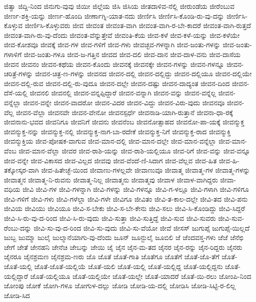 {ಜಿತ್ವಾ
ಜಿದ್ದಿ-ನಿಂದ
ಜಿನುಗು-ವುವು
ಜಿಯೀ
ಜಿಲ್ಲೆಯ
ಜಿಸಿ
ಜಿಸಿಯ
ಜೀತದಾಳಿವ-ನೆಲ್ಲಿ
ಜೀರುಂಡೆಯ
ಜೀರೆಂಬುವ
ಜೀರ್ಣ-ಶಕ್ತಿ-ಯನ್ನು
ಜೀರ್ಣ-ಹೊಂದಿ
ಜೀರ್ಣಾಗ್ನಿ-ಯಾತ-ನದು
ಜೀರ್ಣಿಸಿ
ಜೀರ್ಣಿಸಿ-ಕೊಂಡಿ-ರು-ವು-ದನ್ನು
ಜೀರ್ಣಿಸಿ-ಕೊಳ್ಳುವ
ಜೀರ್ಣಿಸಿ-ಕೊಳ್ಳುವರು
ಜೀವ
ಜೀವಂತ
ಜೀವಂತ-ವಾಗಿ
ಜೀವಂತ-ವಾಗಿ-ರ-ಬೇ-ಕಾದರೆ
ಜೀವಂತ-ವಾಗಿ-ರುತ್ತದೆ
ಜೀವಂತ-ವಾಗಿ-ರು-ವು-ದೆಂದು
ಜೀವಂತ-ವೆನ್ನುತ್ತೇವೆ
ಜೀವಂತಿ-ಕೆಯ
ಜೀವ-ಕಳೆ
ಜೀವ-ಕಳೆ-ಯನ್ನು
ಜೀವ-ಕಳೆಯೇ
ಜೀವ-ಕೋಶವೂ
ಜೀವಕ್ಕೆ
ಜೀವ-ಗಳ
ಜೀವ-ಗಳಿಗೆ
ಜೀವ-ಗಳು
ಜೀವಚ್ಛವ-ಗಳನ್ನಾಗಿ
ಜೀವ-ಜಂತು-ಗಳನ್ನು
ಜೀವ-ಜಂತು-ಗಳಾಳಿಗೆ
ಜೀವ-ಜಂತು-ಗಳೂ
ಜೀವ-ಜ-ಗತ್ತಿನ
ಜೀವದ
ಜೀವ-ದಲಿ
ಜೀವ-ದಾನ
ಜೀವ-ದಾಳ-ವನು
ಜೀವ-ದಾಸೆಯ
ಜೀವನ
ಜೀವನಂ
ಜೀವನ-ಕಥೆಯ
ಜೀವನ-ಕೊಂದು
ಜೀವನಕ್ಕೆ
ಜೀವನಕ್ಕೇ
ಜೀವನ-ಗಳನ್ನು
ಜೀವನ-ಗಳನ್ನೂ
ಜೀವನ-ಚರಿತ್ರೆ-ಗಳನ್ನು
ಜೀವನ-ಚಿತ್ರ-ಣ-ಗಳನ್ನು
ಜೀವನದ
ಜೀವನ-ದಲ್ಲಿ
ಜೀವನ-ದಲ್ಲಿದ್ದು
ಜೀವನ-ದಲ್ಲಿಯೂ
ಜೀವನ-ದಲ್ಲಿಯೇ
ಜೀವನ-ದಲ್ಲಿ-ರುವ
ಜೀವನ-ದಲ್ಲಿ-ರು-ವುದೂ
ಜೀವನ-ದಲ್ಲೇ
ಜೀವನ-ದಷ್ಟು
ಜೀವನ-ದಾದ್ಯಂತ
ಜೀವನ-ದಿಂದ
ಜೀವನ-ದೆಸೆ-ಯಲ್ಲಿ
ಜೀವನಲಿ
ಜೀವನಲ್ಲಿ
ಜೀವನ-ವನ್ನಪ್ಪಿದ್ದಾರೆ
ಜೀವನ-ವನ್ನಾಗಿ
ಜೀವನ-ವನ್ನು
ಜೀವನ-ವನ್ನೆಲ್ಲ
ಜೀವನ-ವನ್ನೆಲ್ಲಾ
ಜೀವನ-ವನ್ನೇ
ಜೀವನ-ವಾದರೋ
ಜೀವನ-ವಿದರ
ಜೀವನ-ವಿದ್ದು
ಜೀವನ-ವಿರು-ವುದು
ಜೀವನವೂ
ಜೀವನ-ವೆಲ್ಲ
ಜೀವನ-ವೆಲ್ಲಾ
ಜೀವನವೇ
ಜೀವನ-ವೇನೋ
ಜೀವನಸ್ಪರ್ಧೆ
ಜೀವನಾಡಿ-ಯಾಗಿ-ರುತ್ತಾನೆ
ಜೀವನಾ-ಧಾ-ರಕ್ಕೆ
ಜೀವನಾನು-ಭವದ
ಜೀವನಿಗೂ
ಜೀವನಿಗೆ
ಜೀವನು
ಜೀವನೆಂಬ
ಜೀವನೋತ್ಸಾಹದ
ಜೀವನೋ-ಪಾ-ಯಕ್ಕೆ
ಜೀವನ್ಮುಕ್ತ
ಜೀವನ್ಮುಕ್ತ-ನನ್ನು
ಜೀವನ್ಮುಕ್ತ-ನಲ್ಲಿ
ಜೀವನ್ಮುಕ್ತ-ನಾಗ-ಬಾ-ರದೇಕೆ
ಜೀವನ್ಮುಕ್ತ-ನಿಗೆ
ಜೀವನ್ಮುಕ್ತ-ರಾದ
ಜೀವನ್ಮುಕ್ತಿ
ಜೀವನ್ಮುಕ್ತಿಯ
ಜೀವ-ಪೋಷಕ-ವಾಗುವ
ಜೀವ-ಮಾನ-ದಲ್ಲಿ
ಜೀವ-ಮಾನ-ದಲ್ಲೇ
ಜೀವ-ಮಾನ-ವನ್ನೆಲ್ಲಾ
ಜೀವ-ಮಾನ-ವೆಂಬ
ಜೀವ-ಮಾನ-ವೆಲ್ಲಾ
ಜೀವರ
ಜೀವ-ರಾಶಿ-ಯನ್ನು
ಜೀವ-ರಾಶಿ-ಯಲ್ಲಿಯೂ
ಜೀವ-ರಿಗೆ
ಜೀವ-ವನ್ನು
ಜೀವ-ವನ್ನೂ
ಜೀವ-ವನ್ನೇ
ಜೀವ-ವಿಕಾಸದ
ಜೀವ-ವಿಲ್ಲದ
ಜೀವವು
ಜೀವ-ವೆಂದೆ-ಣಿ-ಸಿದಾಗ
ಜೀವ-ವೆಲ್ಲವ
ಜೀವ-ಹಿತ
ಜೀವ-ಹಿ-ತಕ್ಕೋಸ್ಕರ-ವಾಗಿ
ಜೀವ-ಹಿತೇಚ್ಛೆ-ಯಿಂದ
ಜೀವಾಣು-ಗಳಲ್ಲವೇ
ಜೀವಾಣುವೂ
ಜೀವಾತ್ಮ
ಜೀವಾತ್ಮ-ಗಳ
ಜೀವಾತ್ಮ-ಗಳನ್ನು
ಜೀವಾತ್ಮನ
ಜೀವಾತ್ಮ-ನಿ-ರುವನು
ಜೀವಾತ್ಮ-ನಿಲ್ಲ
ಜೀವಾತ್ಮನು
ಜೀವಾತ್ಮವು
ಜೀವಾಳ
ಜೀವಾಳ-ವಾಗಿದ್ದರು
ಜೀವಾ-ವಧಿಯ
ಜೀವಿ
ಜೀವಿ-ಗಳ
ಜೀವಿ-ಗಳನ್ನಾಗಿ
ಜೀವಿ-ಗಳನ್ನು
ಜೀವಿ-ಗಳನ್ನೂ
ಜೀವಿ-ಗ-ಳಲ್ಲೂ
ಜೀವಿ-ಗಳಾಗಿ
ಜೀವಿ-ಗಳಿಗೂ
ಜೀವಿ-ಗಳಿಗೆ
ಜೀವಿ-ಗಳು
ಜೀವಿ-ಗಳೆಲ್ಲಾ
ಜೀವಿ-ಗಳೇ
ಜೀವಿಗೂ
ಜೀವಿತಂ
ಜೀವಿ-ತ-ಕಾಲ-ದಲ್ಲೇ
ಜೀವಿ-ತದ
ಜೀವಿ-ಪನು
ಜೀವಿಯ
ಜೀವಿಯು
ಜೀವಿಯೂ
ಜೀವಿ-ಸ-ಬೇಕು
ಜೀವಿ-ಸ-ಬೇ-ಕೇನು
ಜೀವಿ-ಸಲು
ಜೀವಿ-ಸಿ-ಕೊಂಡಿದ್ದು
ಜೀವಿ-ಸಿದ್ದರೆ
ಜೀವಿ-ಸಿ-ರು-ವು-ದ-ರಿಂದ
ಜೀವಿ-ಸಿ-ರು-ವುದು
ಜೀವಿ-ಸುತ್ತಾ
ಜೀವಿ-ಸುತ್ತಿದ್ದೆ
ಜೀವಿ-ಸುವ
ಜೀವಿ-ಸುವರು
ಜೀವಿ-ಸುವ-ರೆಂಬು-ದನ್ನು
ಜೀವಿ-ಸು-ವು-ದ-ರಿಂದ
ಜೀವಿ-ಸು-ವುದು
ಜೀವಿ-ಸು-ವೆಯೋ
ಜೀವೆ
ಜೀಸಸ್
ಜುಗುಪ್ಸೆ
ಜುಗುಪ್ಸೆ-ಯಿಲ್ಲದೆ
ಜುಬ್ಬ
ಜುಮ್ಮಾ
ಜುಲೈ
ಜುಲ್ಮಾನೆಯಾಗು-ವು-ದೆಂದು
ಜೂನ್
ಜೂನ್ಜುಲೈ
ಜೂಬಿಲಿ
ಜೆ
ಜೆಂದವಸ್ತ-ಗಳು
ಜೆಜೆ
ಜೆನೆಛಿ
ಜೇಗೆ
ಜೇತೆ
ಜೇನಹನಿ
ಜೇನೆಚಿ
ಜೇಬನ್ನು
ಜೇಯಿ
ಜೈ
ಜೈನ
ಜೈನ-ಮ-ತದ
ಜೈನರ
ಜೈನ-ರನ್ನು
ಜೈನ-ರಿದ್ದರು
ಜೈನರು
ಜೈನರೂ
ಜೈನಶ್ರಮಣ
ಜೈನಶ್ರಮ-ಣರು
ಜೊ
ಜೊತೆ
ಜೊತೆ-ಗಾತಿ
ಜೊತೆಗೂ
ಜೊತೆಗೆ
ಜೊತೆ-ಜೊ-ತೆಗೆ
ಜೊತೆ-ಜೊತೆ-ಯಲ್ಲಿ
ಜೊತೆ-ಜೊತೆ-ಯಲ್ಲಿಯೆ
ಜೊತೆ-ಯಲಿ
ಜೊತೆ-ಯಲ್ಲಿ
ಜೊತೆ-ಯಲ್ಲಿದ್ದ
ಜೊತೆ-ಯಲ್ಲಿದ್ದನು
ಜೊತೆ-ಯಲ್ಲಿದ್ದಾರೆ
ಜೊತೆ-ಯಲ್ಲಿಯೂ
ಜೊತೆ-ಯಲ್ಲಿಯೇ
ಜೊತೆ-ಯಲ್ಲೇ
ಜೊತೆ-ಯಾದರೆ
ಜೊತೆ-ಯಿ-ರಲು
ಜೋಂಪಿ-ನಿಂದ
ಜೋಂಪು
ಜೋಕೆ
ಜೋಗಿ-ಗಳೂ
ಜೋಗುಳ-ದಲ್ಲು
ಜೋಡಿ
ಜೋಡಿ-ಯ-ದಲ್ಲಿ
ಜೋಡಿಸಿ
ಜೋಡಿ-ಸಿಟ್ಟಿ-ರ-ಲಿಲ್ಲ
ಜೋಡಿ-ಸಿದ
}
